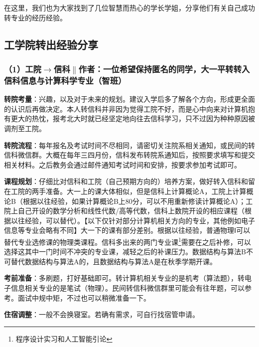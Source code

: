 \documentclass[11pt,oneside]{book}
\begin{document}
在这里，我们也为大家找到了几位智慧而热心的学长学姐，分享他们有关自己成功转专业的经历经验。

\subsection{工学院转出经验分享}
\subsubsection{（1）工院$\to$信科$\parallel$作者：一位希望保持匿名的同学，大一平转转入信科信息与计算科学专业（智班）}
\textbf{转院考量}：兴趣，以及对于未来的规划。建议入学后多了解各个方向，形成更全面的认识后再做决定。本人转信科并非因为觉得工院不好，而是心中向来对计算机抱有更大的热忱，报考北大时就已经坚定地向往去信科学习，只不过因为种种原因被调剂至工院。

\vspace{10pt}

\textbf{转院流程}：每年报名及考试时间不尽相同，请密切关注院系相关通知，或民间的转信科微信群。大概在每年三四月份，信科发布转院系通知后，按照要求填写和提交相关材料。之后教务会通过邮件通知考试时间和安排，按要求参加考试即可。

\vspace{10pt}

\textbf{课程规划}：仔细比对信科和工院（自己预期方向的）培养方案，做好转入信科和留在工院的两手准备。大一上的课大体相似，但是信科上计算概论A，工院上计算概论B（根据以往经验，如果计算概论B上80分，可以不用重新修读计算概论A）；工院上自己开设的数学分析和线性代数/高等代数，信科上数院开设的相应课程（根据以往经验，可以替代）。【以下仅针对部分计算机相关方向的专业，其他例如电子信息等专业会略有不同】大一下的课有部分差别。根据以往经验，普通物理Ⅰ可以替代专业选修课的物理类课程。信科多出来的两门专业课\footnote{程序设计实习和人工智能引论}需要在之后补修，可以选择这其中一门时间不冲突的专业课，减轻之后的补课压力。数据结构与算法B不可替代数据结构与算法A的，且数据结构与算法A是在秋季学期开课。

\vspace{10pt}

\textbf{考前准备}：多刷题，打好基础即可。转计算机相关专业的是机考（算法题），转电子信息相关专业的是笔试（物理）。民间转信科微信群里可能会有往年题，可以参考。面试中规中矩，不过也可以稍微准备一下。

\vspace{10pt}

\textbf{住宿调整}：一般不会换寝室。若确有需求，可自行找宿管申请。

\vspace{10pt}
\end{document}
